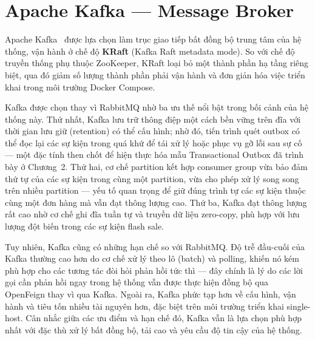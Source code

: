 \documentclass[../DoAn.tex]{subfiles}
\begin{document}

\section{Apache Kafka --- Message Broker}
\label{section:3.3}

Apache Kafka~\cite{narkhede2017} được lựa chọn làm trục giao tiếp bất đồng bộ trung tâm của
hệ thống, vận hành ở chế độ \textbf{KRaft} (Kafka Raft metadata mode). So với chế độ truyền
thống phụ thuộc ZooKeeper, KRaft loại bỏ một thành phần hạ tầng riêng biệt, qua đó giảm số
lượng thành phần phải vận hành và đơn giản hóa việc triển khai trong môi trường Docker
Compose.

Kafka được chọn thay vì RabbitMQ nhờ ba ưu thế nổi bật trong bối cảnh của hệ thống này. Thứ
nhất, Kafka lưu trữ thông điệp một cách bền vững trên đĩa với thời gian lưu giữ (retention)
có thể cấu hình; nhờ đó, tiến trình quét outbox có thể đọc lại các sự kiện trong quá khứ để
tái xử lý hoặc phục vụ gỡ lỗi sau sự cố --- một đặc tính then chốt để hiện thực hóa mẫu
Transactional Outbox đã trình bày ở Chương~2. Thứ hai, cơ chế partition kết hợp consumer
group vừa bảo đảm thứ tự của các sự kiện trong cùng một partition, vừa cho phép xử lý song
song trên nhiều partition --- yếu tố quan trọng để giữ đúng trình tự các sự kiện thuộc cùng
một đơn hàng mà vẫn đạt thông lượng cao. Thứ ba, Kafka đạt thông lượng rất cao nhờ cơ chế
ghi đĩa tuần tự và truyền dữ liệu zero-copy, phù hợp với lưu lượng đột biến trong các sự
kiện flash sale.

Tuy nhiên, Kafka cũng có những hạn chế so với RabbitMQ. Độ trễ đầu-cuối của Kafka thường cao
hơn do cơ chế xử lý theo lô (batch) và polling, khiến nó kém phù hợp cho các tương tác đòi
hỏi phản hồi tức thì --- đây chính là lý do các lời gọi cần phản hồi ngay trong hệ thống vẫn
được thực hiện đồng bộ qua OpenFeign thay vì qua Kafka. Ngoài ra, Kafka phức tạp hơn về cấu
hình, vận hành và tiêu tốn nhiều tài nguyên hơn, đặc biệt trên môi trường triển khai
single-host. Cân nhắc giữa các ưu điểm và hạn chế đó, Kafka vẫn là lựa chọn phù hợp nhất với
đặc thù xử lý bất đồng bộ, tải cao và yêu cầu độ tin cậy của hệ thống.
\end{document}
